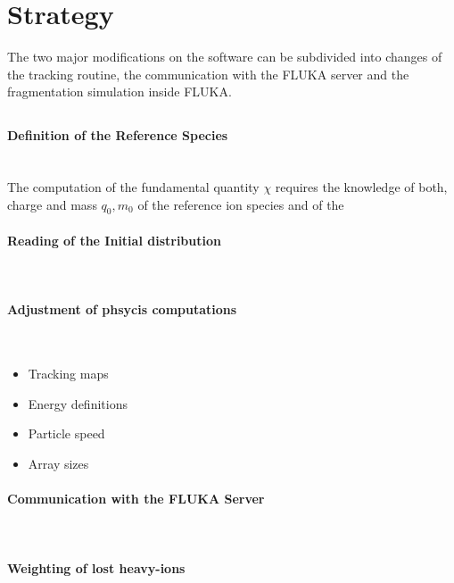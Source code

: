 \section{Strategy}

The two major modifications on the software can be subdivided into changes of the tracking routine, the communication with the FLUKA server and the fragmentation simulation inside FLUKA. 

\subsection{}

\paragraph{Definition of the Reference Species} \mbox{} \\
The computation of the fundamental quantity $\chi$ requires the knowledge of both, charge and mass $q_0,m_0$ of the reference ion species and of the 

\paragraph{Reading of the Initial distribution} \mbox{} \\ 

\paragraph{Adjustment of phsycis computations} \mbox{} \\
\begin{itemize}
\item Tracking maps
\item Energy definitions
\item Particle speed
\item Array sizes
\end{itemize}


\paragraph{Communication with the FLUKA Server}  \mbox{} \\

\paragraph{Weighting of lost heavy-ions}  \mbox{} \\




